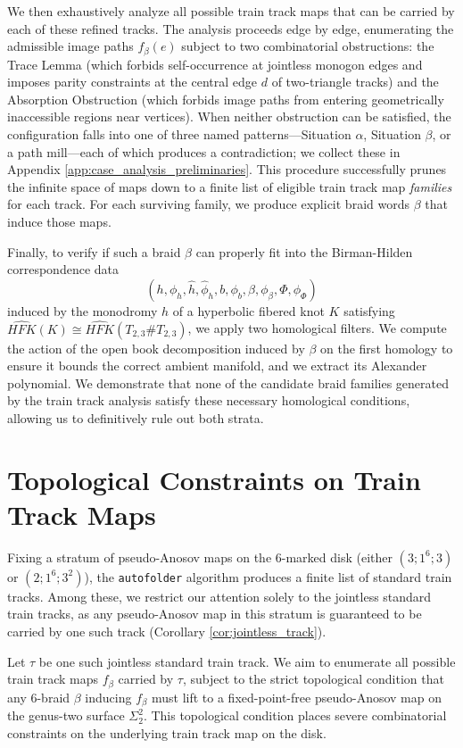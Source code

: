 We then exhaustively analyze all possible train track maps that can be carried by each of these refined tracks. The analysis proceeds edge by edge, enumerating the admissible image paths $f_\beta(e)$ subject to two combinatorial obstructions: the Trace Lemma (which forbids self-occurrence at jointless monogon edges and imposes parity constraints at the central edge $d$ of two-triangle tracks) and the Absorption Obstruction (which forbids image paths from entering geometrically inaccessible regions near vertices). When neither obstruction can be satisfied, the configuration falls into one of three named patterns---Situation $\alpha$, Situation $\beta$, or a path mill---each of which produces a contradiction; we collect these in Appendix \ref{app:case_analysis_preliminaries}. This procedure successfully prunes the infinite space of maps down to a finite list of eligible train track map \textit{families} for each track. For each surviving family, we produce explicit braid words $\beta$ that induce those maps.

Finally, to verify if such a braid $\beta$ can properly fit into the Birman-Hilden correspondence data
\[
(h, \phi_h, \hat{h}, \hat{\phi}_h, b, \phi_b, \beta, \phi_\beta, \Phi, \phi_\Phi)
\]
induced by the monodromy $h$ of a hyperbolic fibered knot $K$ satisfying $\widehat{HFK}(K) \cong \widehat{HFK}(T_{2,3}\# T_{2,3})$, we apply two homological filters. We compute the action of the open book decomposition induced by $\beta$ on the first homology to ensure it bounds the correct ambient manifold, and we extract its Alexander polynomial. We demonstrate that none of the candidate braid families generated by the train track analysis satisfy these necessary homological conditions, allowing us to definitively rule out both strata.


\section{Topological Constraints on Train Track Maps}
\label{sec:traintrack_analysis}

Fixing a stratum of pseudo-Anosov maps on the 6-marked disk (either $(3;1^6;3)$ or $(2;1^6;3^2)$), the \texttt{autofolder} algorithm produces a finite list of standard train tracks. Among these, we restrict our attention solely to the jointless standard train tracks, as any pseudo-Anosov map in this stratum is guaranteed to be carried by one such track (Corollary \ref{cor:jointless_track}).

Let $\tau$ be one such jointless standard train track. We aim to enumerate all possible train track maps $f_\beta$ carried by $\tau$, subject to the strict topological condition that any 6-braid $\beta$ inducing $f_\beta$ must lift to a fixed-point-free pseudo-Anosov map on the genus-two surface $\Sigma_2^2$. This topological condition places severe combinatorial constraints on the underlying train track map on the disk.

